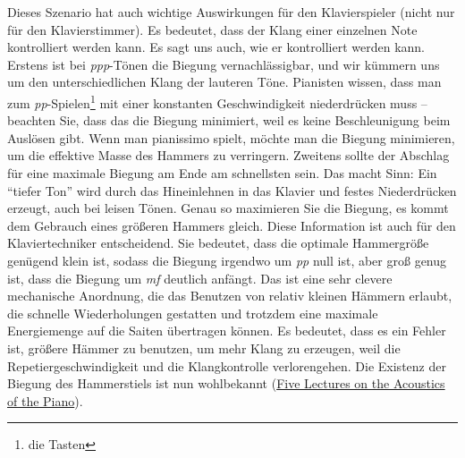 Dieses Szenario hat auch wichtige Auswirkungen für den Klavierspieler (nicht nur für den Klavierstimmer).
Es bedeutet, dass der Klang einer einzelnen Note kontrolliert werden kann.
Es sagt uns auch, wie er kontrolliert werden kann.
Erstens ist bei \textit{ppp}-Tönen die Biegung vernachlässigbar, und wir kümmern uns um den unterschiedlichen Klang der lauteren Töne.
Pianisten wissen, dass man zum \textit{pp}-Spielen\footnote{die Tasten} mit einer konstanten Geschwindigkeit niederdrücken muss -- beachten Sie, dass das die Biegung minimiert, weil es keine Beschleunigung beim Auslösen gibt.
Wenn man pianissimo spielt, möchte man die Biegung minimieren, um die effektive Masse des Hammers zu verringern.
Zweitens sollte der Abschlag für eine maximale Biegung am Ende am schnellsten sein.
Das macht Sinn: Ein \enquote{tiefer Ton} wird durch das Hineinlehnen in das Klavier und festes Niederdrücken erzeugt, auch bei leisen Tönen.
Genau so maximieren Sie die Biegung, es kommt dem Gebrauch eines größeren Hammers gleich.
Diese Information ist auch für den Klaviertechniker entscheidend.
Sie bedeutet, dass die optimale Hammergröße genügend klein ist, sodass die Biegung irgendwo um \textit{pp} null ist, aber groß genug ist, dass die Biegung um \textit{mf} deutlich anfängt.
Das ist eine sehr clevere mechanische Anordnung, die das Benutzen von relativ kleinen Hämmern erlaubt, die schnelle Wiederholungen gestatten und trotzdem eine maximale Energiemenge auf die Saiten übertragen können.
Es bedeutet, dass es ein Fehler ist, größere Hämmer zu benutzen, um mehr Klang zu erzeugen, weil die Repetiergeschwindigkeit und die Klangkontrolle verlorengehen.
Die Existenz der Biegung des Hammerstiels ist nun wohlbekannt (\hyperref[Lectures]{Five Lectures on the Acoustics of the Piano}).

